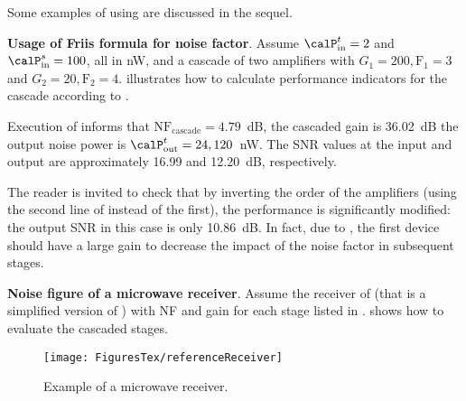

Some examples of using  are discussed in the sequel.

\bExample \textbf{Usage of Friis formula for noise factor}.
\label{ex:cascadeAmpNF}
Assume $\calP_{\textrm{in}}^{t}=2$ and $\calP_{\textrm{in}}^{s}=100$, all in nW, and a cascade of two amplifiers with $G_1=200,\textrm{F}_1=3$ and $G_2=20,\textrm{F}_2=4$. 
 illustrates how to calculate performance indicators
for the cascade according to .



Execution of  informs that $\textrm{NF}_{\textrm{cascade}}=4.79$~dB, the cascaded gain is 36.02~dB the output noise power is $\calP_{\textrm{out}}^{t}=24,120$~nW. %
 The SNR values at the input and output are approximately 16.99 and 12.20~dB, respectively.

The reader is invited to check that by inverting the order of the amplifiers (using the second line of  instead of the first), the performance is significantly modified: the output SNR in this case is only 10.86~dB. In fact, due to , the first device should have a large gain to decrease the impact of the noise factor in subsequent stages.
\eExample

\bExample \textbf{Noise figure of a microwave receiver}.
Assume the receiver of  (that is a simplified version of
)
with NF and gain for each stage listed in .
 shows how to evaluate the cascaded stages.

\begin{figure}[htbp]
	\centering
		\texttt{[image: FiguresTex/referenceReceiver]}		
	\caption{Example of a microwave receiver.\label{fig:referenceReceiver}}
\end{figure}

